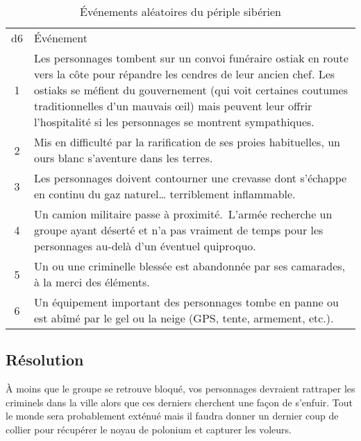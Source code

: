 \begin{table}
	\caption{Événements aléatoires du périple sibérien}
	\label{table:hiver}
	\begin{tabularx}{0.9\textwidth}{cX}
	d6 & Événement\\
	1  & Les personnages tombent sur un convoi funéraire ostiak en route vers la côte pour répandre les cendres de leur ancien chef. Les ostiaks se méfient du gouvernement (qui voit certaines coutumes traditionnelles d'un mauvais œil) mais peuvent leur offrir l'hospitalité si les personnages se montrent sympathiques.\\
	2  & Mis en difficulté par la rarification de ses proies habituelles, un ours blanc s'aventure dans les terres.\\
	3  & Les personnages doivent contourner une crevasse dont s'échappe en continu du gaz naturel… terriblement inflammable.\\
	4  & Un camion militaire passe à proximité. L'armée recherche un groupe ayant déserté et n'a pas vraiment de temps pour les personnages au-delà d'un éventuel quiproquo.\\
	5  & Un ou une criminelle blessée est abandonnée par ses camarades, à la merci des éléments.\\
	6  & Un équipement important des personnages tombe en panne ou est abîmé par le gel ou la neige (GPS, tente, armement, etc.).\\
	\end{tabularx}
\end{table}

\subsection{Résolution}

À moins que le groupe se retrouve bloqué, vos personnages devraient rattraper les criminels dans la ville alors que ces derniers cherchent une façon de s'enfuir.
Tout le monde sera probablement exténué mais il faudra donner un dernier coup de collier pour récupérer le noyau de polonium et capturer les voleurs.

